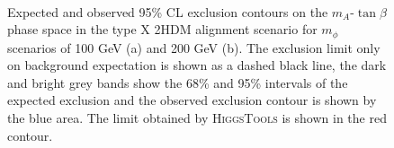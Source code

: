\begin{figure}[!hbtp]
\centering
     \\
\caption[Plots of the model-dependent limits in the type X 2HDM alignment scenario, with overlayed \textsc{HiggsTools} limits.]{Expected and observed 95\% CL exclusion contours on the $m_{A}$-$\tan\beta$ phase space in the type X 2HDM alignment scenario for $m_{\phi}$ scenarios of 100 GeV (a) and 200 GeV (b). The exclusion limit only on background expectation is shown as a dashed black line, the dark and bright grey bands show the 68\% and 95\% intervals of the expected exclusion and the observed exclusion contour is shown by the blue area. The limit obtained by \textsc{HiggsTools} is shown in the red contour.}
\label{fig:4tau_md_hb}
\end{figure}

